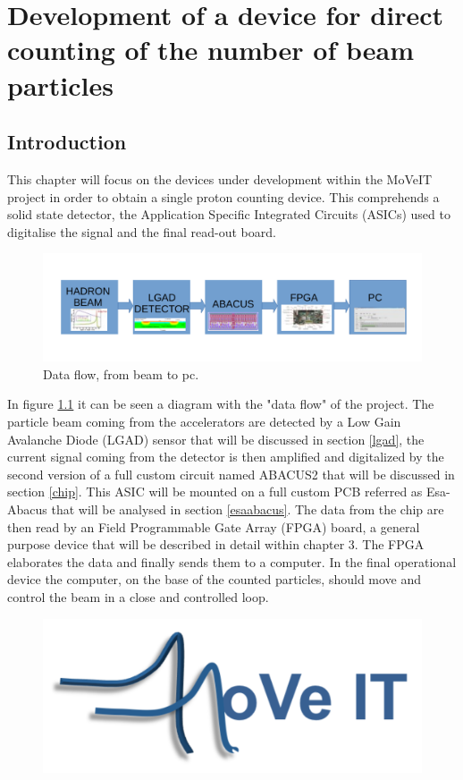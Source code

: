 \chapter{Development of a device for direct counting of the number of beam particles}

\section{Introduction}
This chapter will focus on the devices under development within the MoVeIT project in order to obtain a single proton counting device.
This comprehends a solid state detector, the Application Specific Integrated Circuits (ASICs) used to digitalise the signal and the final read-out board.
\begin{figure}[H]
	\centering
	\includegraphics[width=0.99\linewidth]{IMG/ch2/BLOCK}
	\caption{Data flow, from beam to pc.}
	\label{fig:block}
\end{figure}
\noindent In figure \ref{fig:block} it can be seen a diagram with the "data flow" of the project.
The particle beam coming from the accelerators are detected by a Low Gain Avalanche Diode (LGAD) sensor that will be discussed in section \ref{lgad}, the current signal coming from the detector is then amplified and digitalized by the second version of a full custom circuit named ABACUS2 that will be discussed in section \ref{chip}.
This ASIC will be mounted on a full custom PCB referred as Esa-Abacus that will be analysed in section \ref{esaabacus}.
The data from the chip are then read by an Field Programmable Gate Array (FPGA) board, a general purpose device that will be described in detail within chapter 3.
The FPGA elaborates the data and finally sends them to a computer. In the final operational device the computer, on the base of the counted particles, should move and control the beam in a close and controlled loop. 
\newpage
\begin{figure}[H]
	\centering
	\includegraphics[width=0.35\linewidth]{IMG/ch2/Move_IT_logo}
\end{figure}

